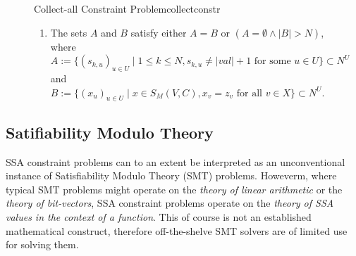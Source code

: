 \begin{figure}[p]
\begin{definition}{Collect-all Constraint Problem}{collectconstr}
\begin{enumerate}
        \item The sets $A$ and $B$ satisfy either $A=B$ or $(A=\emptyset\mathrel\land |B|>N)$, where\\
              $A:=\{(s_{k,u})_{u\in U}\mid 1\leq k\leq N, s_{k,u}\neq|val|+1\text{ for some }u\in U\}\subset N^U$ and\\
              $B:=\{(x_u)_{u\in U}\mid x\in S_M(V,C), x_v=z_v\text{ for all }v\in X\}\subset N^U$.
        \end{enumerate}
    \end{definition}
\end{figure}

\subsection{Satifiability Modulo Theory}

    SSA constraint problems can to an extent be interpreted as an unconventional
    instance of Satisfiability Modulo Theory (SMT) problems.
    Howeverm, where typical SMT problems might operate on the
    {\em theory of linear arithmetic} or the {\em theory of bit-vectors},
    SSA constraint problems operate on the {\em theory of SSA values in the
    context of a function}.
    This of course is not an established mathematical construct, therefore
    off-the-shelve SMT solvers are of limited use for solving them.


